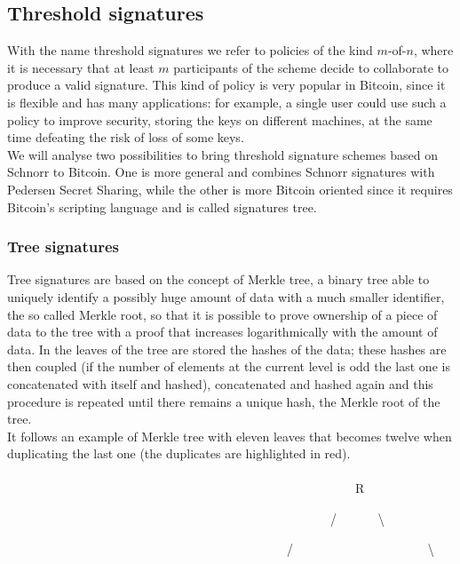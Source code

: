 \subsection{Threshold signatures}
With the name threshold signatures we refer to policies of the kind $m$-of-$n$, where it is necessary that at least $m$ participants of the scheme decide to collaborate to produce a valid signature. This kind of policy is very popular in Bitcoin, since it is flexible and has many applications: for example, a single user could use such a policy to improve security, storing the keys on different machines, at the same time defeating the risk of loss of some keys. 
\\
We will analyse two possibilities to bring threshold signature schemes based on Schnorr to Bitcoin. One is more general and combines Schnorr signatures with Pedersen Secret Sharing, while the other is more Bitcoin oriented since it requires Bitcoin's scripting language and is called signatures tree.

\subsubsection{Tree signatures}
Tree signatures are based on the concept of Merkle tree, a binary tree able to uniquely identify a possibly huge amount of data with a much smaller identifier, the so called Merkle root, so that it is possible to prove ownership of a piece of data to the tree with a proof that increases logarithmically with the amount of data. In the leaves of the tree are stored the hashes of the data; these hashes are then coupled (if the number of elements at the current level is odd the last one is concatenated with itself and hashed), concatenated and hashed again and this procedure is repeated until there remains a unique hash, the Merkle root of the tree. 
\\
It follows an example of Merkle tree with eleven leaves that becomes twelve when duplicating the last one (the duplicates are highlighted in red).
\\
\\

\ \ \ \ \ \ \ \ \ \ \ \ \ \ \ \ \ \ \ \ \ \ \ \ \ \ \ \ \ \ \ \ \ \ \ \ \ \ \ \ \ \ \ \ \ \ \ \ \ \ \ \ \ \ \ \ R

\ \ \ \ \ \ \ \ \ \ \ \ \ \ \ \ \ \ \ \ \ \ \ \ \ \ \ \ \ \ \ \ \ \ \ \ \ \ \ \ \ \ \ \ \ \ \ \ \ \ \ \ / \ \ \ \ \ \ \textbackslash

\ \ \ \ \ \ \ \ \ \ \ \ \ \ \ \ \ \ \ \ \ \ \ \ \ \ \ \ \ \ \ \ \ \ \ \ \ \ \ \ \ \ \ \ \ /  \ \ \ \ \ \ \ \ \ \ \ \ \ \ \ \ \ \ \ \ \ \textbackslash

